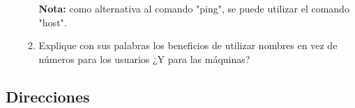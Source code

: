 \documentclass[12pt]{article}
\begin{document}
\begin{enumerate}
\begin{enumerate}
\begin{itemize}
            \end{itemize}

                \textbf{Nota:} como alternativa al comando "ping", se puede utilizar el
                comando "host".
            
            \item Explique con sus palabras los beneficios de utilizar nombres
                en vez de números para los usuarios ¿Y para las máquinas?

        \end{enumerate}

\end{enumerate}

\subsection*{Direcciones}
\end{document}
